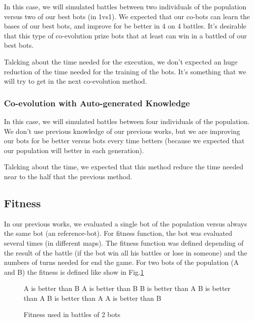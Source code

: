 \documentclass{llncs}
\begin{document}
In this case, we will simulated battles between two individuals of the population versus two of our best bots (in 1vs1). We expected that our co-bots can learn the bases of our best bots, and improve for be better in 4 on 4 battles. It's desirable that this type of co-evolution prize bots that at least can win in a battled of our best bots.

Talcking about the time needed for the execution, we don't expected an huge reduction of the time needed for the training of the bots. It's something that we will try to get in the next co-evolution method.

\subsubsection{Co-evolution with Auto-generated Knowledge}
In this case, we will simulated battles between four individuals of the population. We don't use previous knowledge of our previous works, but we are improving our bots for be better versus bots every time betters (because we expected that our population will better in each generation).

Talcking about the time, we expected that this method reduce the time needed near to the half that the previous method.

\subsection{Fitness}

In our previous works, we evaluated a single bot of the population versus always the same bot (an reference-bot). For fitness function, the bot was evaluated several times (in different maps). The fitness function was defined depending of the result of the battle (if the bot win all his battles or lose in someone) and the numbers of turns needed for end the game. For two bots of the population (A and B) the fitness is defined like show in Fig.\ref{fig:fitness_clasico}

\begin{figure}
\begin{algorithmic}
        \State A is better than B
        \State A is better than B
    \Else
        \State B is better than A
    \EndIf
\Else
        \State B is better than A
        \State B is better than A
    \Else
        \State A is better than B
    \EndIf
\EndIf
\end{algorithmic}
\caption{Fitness used in battles of 2 bots}
\label{fig:fitness_clasico}
\end{figure}
\end{document}
